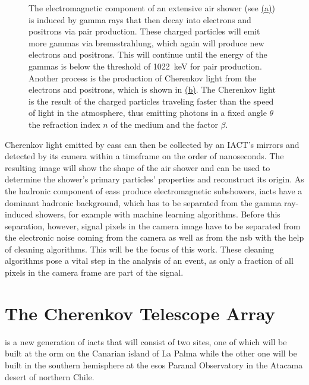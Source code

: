 \begin{figure}
\begin{subfigure}[t]{0.45\textwidth}
        \label{fig:cherenkov}
    \end{subfigure}
    \caption{The electromagnetic component of an extensive air shower (see \hyperref[fig:heitler_model]{(a)})
    is induced by gamma rays that then decay into electrons and positrons via pair production.
    These charged particles will emit more gammas via bremsstrahlung, which again will produce
    new electrons and positrons. This will continue until the energy of the gammas is below
    the threshold of \SI{1022}{\kilo\eV} for pair production. Another process is the production of
    Cherenkov light from the electrons and positrons, which is shown in \hyperref[fig:cherenkov]{(b)}.
    The Cherenkov light is the result of the charged particles traveling faster than the speed of light
    in the atmosphere, thus emitting photons in a fixed angle \(\theta\) \wrt the refraction index
    \(n\) of the medium and the factor \(\beta\).}%
    \label{fig:cherenkov_heitler}
\end{figure}

Cherenkov light emitted by \glspl{eas} can then be collected by an IACT's mirrors and detected by
its camera within a timeframe on the order of nanoseconds. The resulting image will show the shape
of the air shower and can be used to determine the shower's primary particles' properties and
reconstruct its origin. As the hadronic component of \glspl{eas} produce
electromagnetic subshowers, \glspl{iact} have a dominant hadronic background, which has to be
separated from the gamma ray-induced showers, for example with
machine learning algorithms. Before this separation, however, signal pixels in the camera image have to be
separated from the electronic noise coming from the camera as well as from the \gls{nsb} with the help of
cleaning algorithms. This will be the focus of this work. These cleaning algorithms pose a vital step
in the analysis of an event, as only a fraction of all pixels in the camera frame are part of the signal.


\section{The Cherenkov Telescope Array}%
\label{sec:cta}

\cta{} is a new generation of \glspl{iact} that will consist of two sites,
one of which will be built at the \gls{orm} on the Canarian island of La Palma while the other one
will be built in the southern hemisphere at the \glspl{eso} Paranal Observatory in the Atacama desert
of northern Chile.

